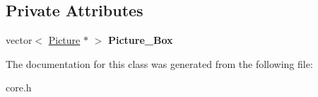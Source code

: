 \subsection*{Private Attributes}
\begin{DoxyCompactItemize}
\item 
\mbox{\label{class_mywebcam_1_1_my_picture_box_a1200ff1d009a9474d37487d02f392f11}} 
vector$<$ \hyperlink{class_mywebcam_1_1_picture}{Picture} $\ast$ $>$ {\bfseries Picture\+\_\+\+Box}
\end{DoxyCompactItemize}


The documentation for this class was generated from the following file\+:\begin{DoxyCompactItemize}
\item 
core.\+h\end{DoxyCompactItemize}
